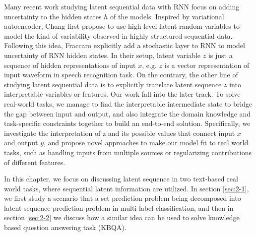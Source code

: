 Many recent work studying latent sequential data with RNN focus on adding uncertainty to the hidden states $h$ of the models. Inspired by variational autoencoder, Chung \cite{chung2015recurrent} first propose to use high-level latent random variables to model the kind of variability observed in highly structured sequential data. Following this idea, Fraccaro \cite{fraccaro2016sequential} explicitly add a stochastic layer to RNN to model uncertainty of RNN hidden states. In their setup, latent variable $z$ is just a sequence of hidden representations of input $x$, e.g. $z$ is a vector representation of input waveform in speech recognition task. On the contrary, the other line of studying latent sequential data is to explicitly translate latent sequence $z$ into interpretable variables or features. Our work fall into the later track. To solve real-world tasks, we manage to find the interpretable intermediate state to bridge the gap between input and output, and also integrate the domain knowledge and task-specific constraints together to build an end-to-end solution. Specifically, we investigate the interpretation of z and its possible values that connect input $x$ and output $y$, and propose novel approaches to make our model fit to real world tasks, such as handling inputs from multiple sources or regularizing contributions of different features.


In this chapter, we focus on discussing latent sequence in two text-based real world tasks, where sequential latent information are utilized. In section \ref{sec:2-1}, we first study a scenario that a set prediction problem being decomposed into latent sequence prediction problem in multi-label classification, and then in section \ref{sec:2-2} we discuss how a similar idea can be used to solve knowledge based question answering task (KBQA).
